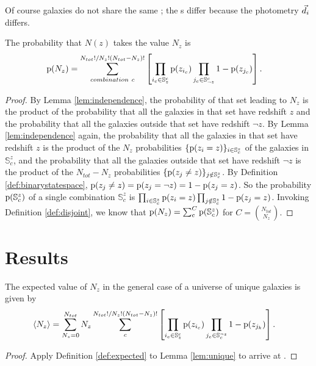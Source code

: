 Of course galaxies do not share the same \pzpdf; the \pzpdf s differ because the photometry $\vec{d}_{i}$ differs.
\begin{lemma}\label{lem:unique}
	The probability that $N(z)$ takes the value $N_{z}$ is 
	\begin{align}
	\eqlabel{eqn:general}
	\pr{N_{z}} &= \sum_{combination\ c}^{N_{tot}! / N_{z}! (N_{tot} - N_{z})!} \left[ \prod_{i_{c} \in \mathbb{S}_{z}^{c}} \pr{z_{i_{c}}} \prod_{j_{c} \in \mathbb{S}_{\lnot z}^{c}} 1 - \pr{z_{j_{c}}} \right] .
	\end{align}
\end{lemma}
\begin{proof}
	By Lemma \ref{lem:independence}, the probability of that set leading to $N_{z}$ is the product of the probability that all the galaxies in that set have redshift $z$ and the probability that all the galaxies outside that set have redshift $\lnot z$.
	By Lemma \ref{lem:independence} again, the probability that all the galaxies in that set have redshift $z$ is the product of the $N_{z}$ probabilities $\{\mathrm{p}(z_{i} = z)\}_{i \in \mathbb{S}^{z}_{c}}$ of the galaxies in $\mathbb{S}^{z}_{c}$, and the probability that all the galaxies outside that set have redshift $\lnot z$ is the product of the $N_{tot} - N_{z}$ probabilities $\{\mathrm{p}(z_{j} \neq z)\}_{j \notin \mathbb{S}^{z}_{c}}$.
	By Definition \ref{def:binarystatespace}, $\mathrm{p}(z_{j} \neq z) = \mathrm{p}(z_{j} = \lnot z) = 1 - \mathrm{p}(z_{j} = z)$.
	So the probability $\mathrm{p}(\mathbb{S}^{z}_{c})$ of a single combination $\mathbb{S}^{z}_{c}$ is $\prod_{i \in \mathbb{S}^{z}_{c}} \mathrm{p}(z_{i} = z) \prod_{j \notin \mathbb{S}^{z}_{c}} 1 - \mathrm{p}(z_{j} = z)$.
	Invoking Definition \ref{def:disjoint}, we know that $\mathrm{p}(N_{z}) = \sum_{c}^{C} \mathrm{p}(\mathbb{S}^{z}_{c})$ for $C = \binom{N_{tot}}{N_{z}}$.
\end{proof}

\section{Results}

\begin{theorem}\label{thm:general}
	The expected value of $N_{z}$ in the general case of a universe of unique galaxies is given by
	\begin{align}
	\eqlabel{eqn:complete}
	\langle N_{z} \rangle &= \sum_{N_{z} = 0}^{N_{tot}} N_{z} \sum_{c}^{N_{tot}! / N_{z}! (N_{tot} - N_{z})!} \left[ \prod_{i_{c} \in \mathbb{S}^{c}_{z}} \pr{z_{i_{c}}} \prod_{j_{c} \in \mathbb{S}_{c}^{\lnot z}} 1 - \pr{z_{j_{k}}} \right].
	\end{align}
\end{theorem}
\begin{proof}
	Apply Definition \ref{def:expected} to Lemma \ref{lem:unique} to arrive at .
\end{proof}

